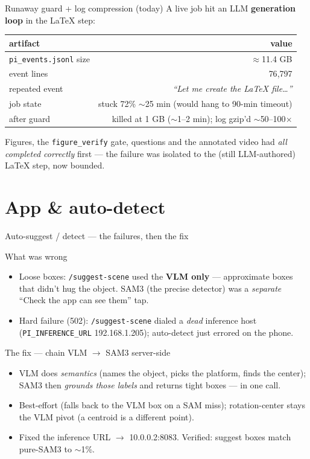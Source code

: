 \documentclass[10pt,aspectratio=169]{beamer}
\newcommand{\gd}[1]{\textcolor{good}{#1}}
\newcommand{\bd}[1]{\textcolor{bad}{#1}}
\begin{document}
\begin{frame}{Runaway guard + log compression (today)}
A live job hit an LLM \textbf{generation loop} in the LaTeX step:
\centering\small
\begin{tabular}{lr}
\toprule
artifact & value \\
\midrule
\texttt{pi\_events.jsonl} size & \bd{$\approx$11.4 GB} \\
event lines & \bd{76{,}797} \\
repeated event & \emph{``Let me create the LaTeX file\ldots''} \\
job state & stuck 72\% $\sim$25 min (would hang to 90-min timeout) \\
\midrule
\gd{after guard} & \gd{killed at 1 GB ($\sim$1--2 min); log gzip'd $\sim$50--100$\times$} \\
\bottomrule
\end{tabular}
\par\vspace{0.5em}
\footnotesize Figures, the \texttt{figure\_verify} gate, questions and the annotated video had \emph{all completed correctly} first --- the failure was isolated to the (still LLM-authored) LaTeX step, now bounded.
\end{frame}

\section{App \& auto-detect}

\begin{frame}{Auto-suggest / detect --- the failures, then the fix}
\begin{block}{What was wrong}
\begin{itemize}\footnotesize
  \item \bd{Loose boxes:} \texttt{/suggest-scene} used the \textbf{VLM only} --- approximate boxes that didn't hug the object. SAM3 (the precise detector) was a \emph{separate} ``Check the app can see them'' tap.
  \item \bd{Hard failure (502):} \texttt{/suggest-scene} dialed a \emph{dead} inference host (\texttt{PI\_INFERENCE\_URL} 192.168.1.205); auto-detect just errored on the phone.
\end{itemize}
\end{block}
\begin{block}{The fix --- chain VLM $\to$ SAM3 server-side}
\begin{itemize}\footnotesize
  \item VLM does \emph{semantics} (names the object, picks the platform, finds the center); SAM3 then \emph{grounds those labels} and returns \gd{tight boxes} --- in one call.
  \item Best-effort (falls back to the VLM box on a SAM miss); rotation-center stays the VLM pivot (a centroid is a different point).
  \item Fixed the inference URL $\to$ \gd{10.0.0.2:8083}. \gd{Verified: suggest boxes match pure-SAM3 to $\sim$1\%.}
\end{itemize}
\end{block}
\end{frame}
\end{document}

